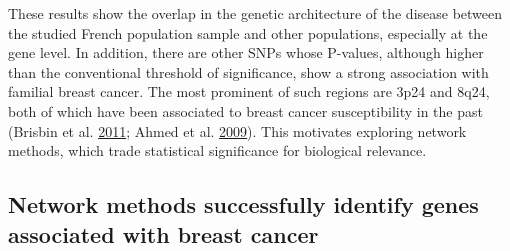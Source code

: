 \documentclass[
  11pt,
]{env/yjiao}
\begin{document}
These results show the overlap in the genetic architecture of the
disease between the studied French population sample and other
populations, especially at the gene level. In addition, there are other
SNPs whose P-values, although higher than the conventional threshold of
significance, show a strong association with familial breast cancer. The
most prominent of such regions are 3p24 and 8q24, both of which have
been associated to breast cancer susceptibility in the past
(Brisbin et al. \protect\hyperlink{ref-brisbin_meta-analysis_2011}{2011}; Ahmed et al. \protect\hyperlink{ref-search_newly_2009}{2009}). This motivates
exploring network methods, which trade statistical significance for
biological relevance.

\hypertarget{results:separate-networks}{%
\subsection{Network methods successfully identify genes associated with breast cancer}\label{results:separate-networks}}
\end{document}
